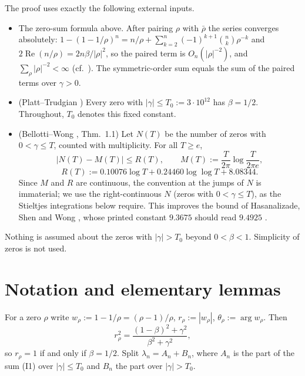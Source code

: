 \documentclass[11pt]{article}
\theoremstyle{remark}
\renewcommand{\Re}{\operatorname{Re}}
\begin{document}
The proof uses exactly the following external inputs.
\begin{itemize}
\item[(I1)] The zero-sum formula above. After pairing $\rho$ with $\bar\rho$ the series converges absolutely: $1-(1-1/\rho)^n=n/\rho+\sum_{k=2}^n(-1)^{k+1}\binom nk\rho^{-k}$ and $2\Re(n/\rho)=2n\beta/|\rho|^2$, so the paired term is $O_n(|\rho|^{-2})$, and $\sum_\rho|\rho|^{-2}<\infty$ (cf.\ \cite{BL99}). The symmetric-order sum equals the sum of the paired terms over $\gamma>0$.
\item[(I2)] (Platt--Trudgian \cite{PT21}) Every zero with $|\gamma|\le T_0:=3\cdot10^{12}$ has $\beta=1/2$. Throughout, $T_0$ denotes this fixed constant.
\item[(I3)] (Bellotti--Wong \cite{BW25}, Thm.~1.1) Let $N(T)$ be the number of zeros with $0<\gamma\le T$, counted with multiplicity. For all $T\ge e$,
\[
\bigl|N(T)-M(T)\bigr|\le R(T),\qquad M(T):=\frac{T}{2\pi}\log\frac{T}{2\pi e},
\]
\[
R(T):=0.10076\log T+0.24460\log\log T+8.08344 .
\]
Since $M$ and $R$ are continuous, the convention at the jumps of $N$ is immaterial; we use the right-continuous $N$ (zeros with $0<\gamma\le T$), as the Stieltjes integrations below require. This improves the bound of Hasanalizade, Shen and Wong \cite{HSW22}, whose printed constant $9.3675$ should read $9.4925$ \cite[p.~2, footnote~1]{BW25}.
\end{itemize}
Nothing is assumed about the zeros with $|\gamma|>T_0$ beyond $0<\beta<1$. Simplicity of zeros is not used.

\section{Notation and elementary lemmas}

For a zero $\rho$ write $w_\rho:=1-1/\rho=(\rho-1)/\rho$, $r_\rho:=|w_\rho|$, $\theta_\rho:=\arg w_\rho$. Then
\begin{equation}\label{eq:r}
r_\rho^2=\frac{(1-\beta)^2+\gamma^2}{\beta^2+\gamma^2},
\end{equation}
so $r_\rho=1$ if and only if $\beta=1/2$. Split $\lambda_n=A_n+B_n$, where $A_n$ is the part of the sum (I1) over $|\gamma|\le T_0$ and $B_n$ the part over $|\gamma|>T_0$.
\end{document}
